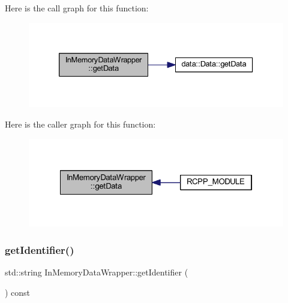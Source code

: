 Here is the call graph for this function\+:
\nopagebreak
\begin{figure}[H]
\begin{center}
\leavevmode
\includegraphics[width=333pt]{class_in_memory_data_wrapper_a69c754048807d42d8178914e8339a808_cgraph}
\end{center}
\end{figure}
Here is the caller graph for this function\+:\nopagebreak
\begin{figure}[H]
\begin{center}
\leavevmode
\includegraphics[width=322pt]{class_in_memory_data_wrapper_a69c754048807d42d8178914e8339a808_icgraph}
\end{center}
\end{figure}
\mbox{\label{class_in_memory_data_wrapper_a2a81d397debd1c568f638004090cbdef}} 
\subsubsection{\texorpdfstring{get\+Identifier()}{getIdentifier()}}
{\footnotesize\ttfamily std\+::string In\+Memory\+Data\+Wrapper\+::get\+Identifier (\begin{DoxyParamCaption}{ }\end{DoxyParamCaption}) const\hspace{0.3cm}{\ttfamily [inline]}}

